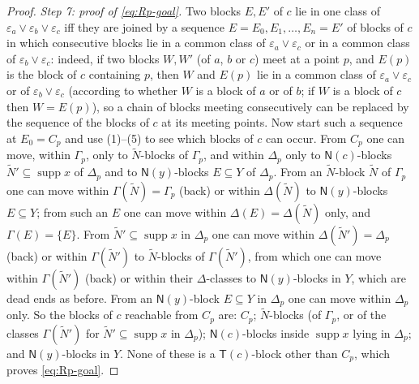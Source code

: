 \documentclass[11pt]{amsart}
\theoremstyle{definition}
\newcommand{\supp}{\operatorname{supp}}
\newcommand{\T}{\mathsf{T}}
\newcommand{\N}{\mathsf{N}}
\begin{document}
\begin{proof}
\emph{Step 7: proof of \eqref{eq:Rp-goal}.} Two blocks $E,E'$ of $c$ lie in one class of $\varepsilon_a\vee\varepsilon_b\vee\varepsilon_c$ iff they are joined by a sequence $E=E_0,E_1,\dots,E_n=E'$ of blocks of $c$ in which consecutive blocks lie in a common class of $\varepsilon_a\vee\varepsilon_c$ or in a common class of $\varepsilon_b\vee\varepsilon_c$: indeed, if two blocks $W,W'$ (of $a$, $b$ or $c$) meet at a point $p$, and $E(p)$ is the block of $c$ containing $p$, then $W$ and $E(p)$ lie in a common class of $\varepsilon_a\vee\varepsilon_c$ or of $\varepsilon_b\vee\varepsilon_c$ (according to whether $W$ is a block of $a$ or of $b$; if $W$ is a block of $c$ then $W=E(p)$), so a chain of blocks meeting consecutively can be replaced by the sequence of the blocks of $c$ at its meeting points. Now start such a sequence at $E_0=C_p$ and use (1)--(5) to see which blocks of $c$ can occur. From $C_p$ one can move, within $\Gamma_p$, only to $\tilde N$-blocks of $\Gamma_p$, and within $\Delta_p$ only to $\N(c)$-blocks $\tilde N'\subseteq\supp x$ of $\Delta_p$ and to $\N(y)$-blocks $E\subseteq Y$ of $\Delta_p$. From an $\tilde N$-block $\tilde N$ of $\Gamma_p$ one can move within $\Gamma(\tilde N)=\Gamma_p$ (back) or within $\Delta(\tilde N)$ to $\N(y)$-blocks $E\subseteq Y$; from such an $E$ one can move within $\Delta(E)=\Delta(\tilde N)$ only, and $\Gamma(E)=\{E\}$. From $\tilde N'\subseteq\supp x$ in $\Delta_p$ one can move within $\Delta(\tilde N')=\Delta_p$ (back) or within $\Gamma(\tilde N')$ to $\tilde N$-blocks of $\Gamma(\tilde N')$, from which one can move within $\Gamma(\tilde N')$ (back) or within their $\Delta$-classes to $\N(y)$-blocks in $Y$, which are dead ends as before. From an $\N(y)$-block $E\subseteq Y$ in $\Delta_p$ one can move within $\Delta_p$ only. So the blocks of $c$ reachable from $C_p$ are: $C_p$; $\tilde N$-blocks (of $\Gamma_p$, or of the classes $\Gamma(\tilde N')$ for $\tilde N'\subseteq\supp x$ in $\Delta_p$); $\N(c)$-blocks inside $\supp x$ lying in $\Delta_p$; and $\N(y)$-blocks in $Y$. None of these is a $\T(c)$-block other than $C_p$, which proves \eqref{eq:Rp-goal}.


\end{proof}
\end{document}
